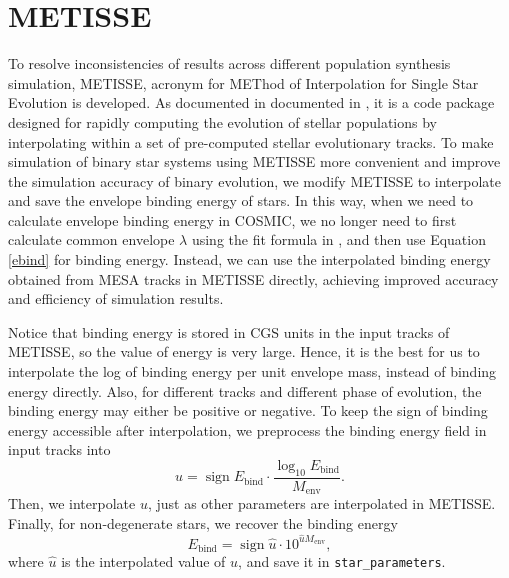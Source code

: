 \documentclass[12pt]{article}
\newcommand{\Ebind}{E_{\mathrm{bind}}}
\newcommand{\Menv}{M_{\mathrm{env}}}
\DeclareMathOperator{\sgn}{sign}
\begin{document}
\section{METISSE} \label{sec:metisse}
To resolve inconsistencies of results across different population synthesis simulation, METISSE, acronym for METhod of Interpolation for Single Star Evolution is developed. As documented in documented in \cite{Agrawal_2020,Agrawal_2023}, it is a code package designed for rapidly computing the evolution of stellar populations by interpolating within a set of pre-computed stellar evolutionary tracks. To make simulation of binary star systems using METISSE more convenient and improve the simulation accuracy of binary evolution, we modify METISSE to interpolate and save the envelope binding energy of stars. In this way, when we need to calculate envelope binding energy in COSMIC, we no longer need to first calculate common envelope $\lambda$ using the fit formula in \cite{claeys2014theoretical}, and then use Equation \ref{ebind} for binding energy. Instead, we can use the interpolated binding energy obtained from MESA tracks in METISSE directly, achieving improved accuracy and efficiency of simulation results.

Notice that binding energy is stored in CGS units in the input tracks of METISSE, so the value of energy is very large. Hence, it is the best for us to interpolate the log of binding energy per unit envelope mass, instead of binding energy directly. Also, for different tracks and different phase of evolution, the binding energy may either be positive or negative. To keep the sign of binding energy accessible after interpolation, we preprocess the binding energy field in input tracks into
\begin{equation}
  u = \sgn{\Ebind} \cdot \frac{\log_{10} \Ebind}{\Menv}.
\end{equation}
Then, we interpolate $u$, just as other parameters are interpolated in METISSE. Finally, for non-degenerate stars, we recover the binding energy
\begin{equation}
  \Ebind = \sgn{\hat u} \cdot 10^{\hat u \Menv},
\end{equation}
where $\hat u$ is the interpolated value of $u$, and save it in \verb|star_parameters|.

\newpage


\end{document}
